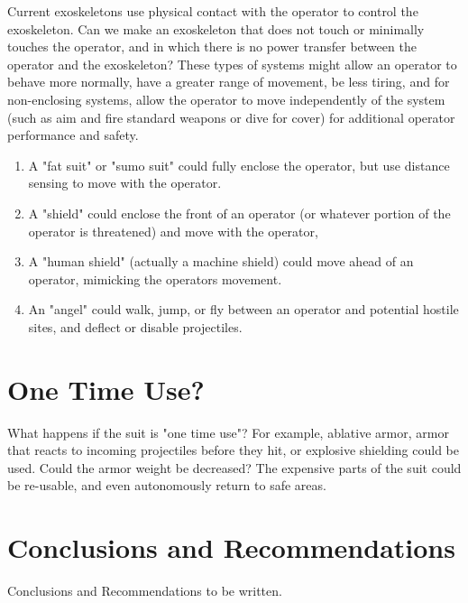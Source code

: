 \documentclass[letterpaper,12pt,fullpage]{article}
\begin{document}
Current exoskeletons use physical contact with the operator to control
the exoskeleton. Can we make an exoskeleton that does not touch or
minimally touches the operator, and in which there is no power
transfer between the operator and the exoskeleton? These types of
systems might allow an operator to behave more normally, have a
greater range of movement, be less tiring, and for non-enclosing
systems, allow the operator to move independently of the system (such
as aim and fire standard weapons or dive for cover) for additional
operator performance and safety.
\begin{enumerate}
\item
A "fat suit" or "sumo suit" could fully enclose the operator, but
use distance sensing to move with the operator.
\item
A "shield" could enclose the front of an operator (or whatever
portion of the operator is threatened) and move with the operator,
\item
A "human shield" (actually a machine shield) could move ahead of
an operator, mimicking the operators movement.
\item
An "angel" could walk, jump, or fly between an operator and potential
hostile sites, and deflect or disable projectiles.
\end{enumerate}

\section{One Time Use?}

What happens if the suit is "one time use"? For example, ablative armor,
armor that reacts to incoming projectiles before they hit,
or explosive shielding could be used. Could the armor weight be decreased?
The expensive parts of the suit could be re-usable, and even autonomously
return to safe areas.

\section{Conclusions and Recommendations}

Conclusions and Recommendations to be written.



\end{document}
